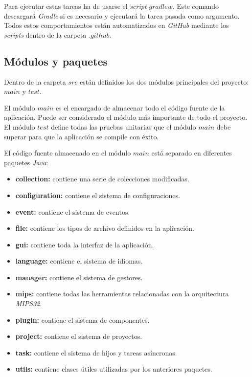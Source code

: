 \noindent Para ejecutar estas tareas ha de usarse el \textit{script} $gradlew$.
Este comando descargará \textit{Gradle} si es necesario y ejecutará
la tarea pasada como argumento.
Todos estos comportamientos están automatizados en \textit{GitHub}
mediante los \textit{scripts} dentro de la carpeta $.github$.

\subsection{Módulos y paquetes}\label{subsec:modulos-y-paquetes}

Dentro de la carpeta $src$ están definidos los dos módulos principales del
proyecto: $main$ y $test$.

\noindent El módulo $main$ es el encargado de almacenar todo el código fuente
de la aplicación.
Puede ser considerado el módulo más importante de todo el proyecto.
El módulo $test$ define todas las pruebas unitarias que el módulo $main$
debe superar para que la aplicación se compile con éxito.

\noindent El código fuente almacenado en el módulo $main$ está separado en diferentes
paquetes \textit{Java}:
\begin{itemize}
    \item \textbf{collection:} contiene una serie de colecciones modificadas.
    \item \textbf{configuration:} contiene el sistema de configuraciones.
    \item \textbf{event:} contiene el sistema de eventos.
    \item \textbf{file:} contiene los tipos de archivo definidos en la aplicación.
    \item \textbf{gui:} contiene toda la interfaz de la aplicación.
    \item \textbf{language:} contiene el sistema de idiomas.
    \item \textbf{manager:} contiene el sistema de gestores.
    \item \textbf{mips:} contiene todas las herramientas relacionadas con la arquitectura \textit{MIPS32}.
    \item \textbf{plugin:} contiene el sistema de componentes.
    \item \textbf{project:} contiene el sistema de proyectos.
    \item \textbf{task:} contiene el sistema de hijos y tareas asíncronas.
    \item \textbf{utils:} contiene clases útiles utilizadas por los anteriores paquetes.
\end{itemize}


